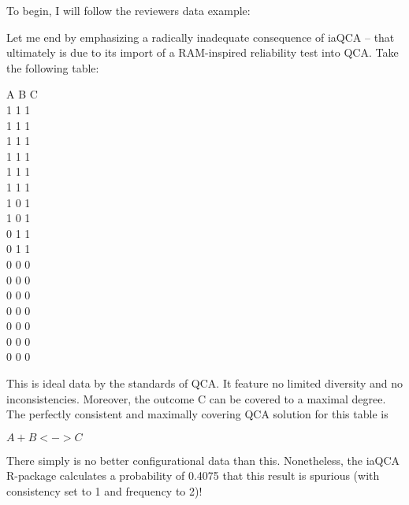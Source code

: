 \documentclass[12pt,stdletter,dateno,sigleft]{newlfm} %
\begin{document}
\begin{newlfm}
To begin, I will follow the reviewers data example: 

\begin{displayquote}
Let me end by emphasizing a radically inadequate consequence of iaQCA -- that ultimately is due to its import of a RAM-inspired reliability test into QCA. Take the following table:

\begin{center}
A B C \\
1 1 1 \\
1 1 1\\
1 1 1\\
1 1 1\\
1 1 1\\
1 1 1\\
1 0 1\\
1 0 1\\
0 1 1\\
0 1 1\\
0 0 0\\
0 0 0\\
0 0 0\\
0 0 0\\
0 0 0\\
0 0 0\\
0 0 0\\
\end{center}

This is ideal data by the standards of QCA. It feature no limited diversity and no inconsistencies. Moreover, the outcome C can be covered to a maximal degree. The perfectly consistent and maximally covering QCA solution for this table is

\begin{center}
$A + B <-> C$
\end{center}

There simply is no better configurational data than this. Nonetheless, the iaQCA R-package calculates a probability of 0.4075 that this result is spurious (with consistency set to 1 and frequency to 2)!
\end{displayquote}



\end{newlfm}
\end{document}
